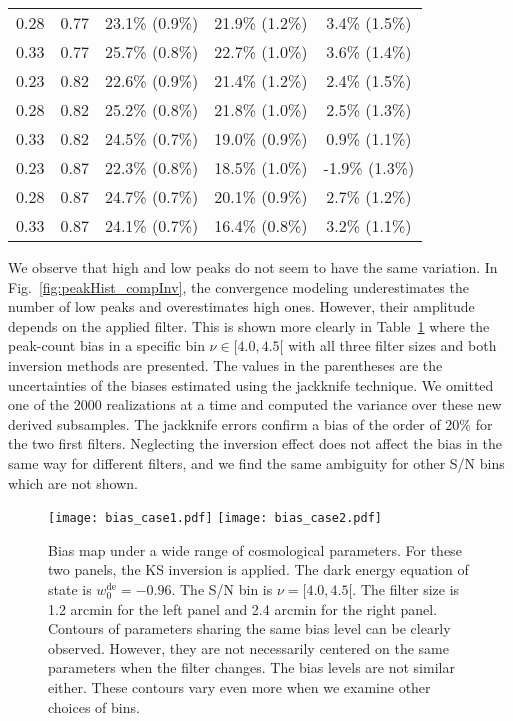 \documentclass{aa} %
\newcommand{\fig}[1]{Fig.~\ref{#1}}
\newcommand{\tab}[1]{Table~\ref{#1}}
\newcommand{\wZero}{w_0^\mathrm{de}}
\begin{document}
\begin{table}[tb]
\begin{tabular}{cc|ccc}
        0.28 & 0.77 &  23.1\%  (0.9\%) &  21.9\%  (1.2\%) &   3.4\%  (1.5\%) \\
        0.33 & 0.77 &  25.7\%  (0.8\%) &  22.7\%  (1.0\%) &   3.6\%  (1.4\%) \\
        0.23 & 0.82 &  22.6\%  (0.9\%) &  21.4\%  (1.2\%) &   2.4\%  (1.5\%) \\
        0.28 & 0.82 &  25.2\%  (0.8\%) &  21.8\%  (1.0\%) &   2.5\%  (1.3\%) \\
        0.33 & 0.82 &  24.5\%  (0.7\%) &  19.0\%  (0.9\%) &   0.9\%  (1.1\%) \\
        0.23 & 0.87 &  22.3\%  (0.8\%) &  18.5\%  (1.0\%) &  -1.9\%  (1.3\%) \\
        0.28 & 0.87 &  24.7\%  (0.7\%) &  20.1\%  (0.9\%) &   2.7\%  (1.2\%) \\
        0.33 & 0.87 &  24.1\%  (0.7\%) &  16.4\%  (0.8\%) &   3.2\%  (1.1\%) \\
        \hline
    \end{tabular}
        \label{tab:bias_filter}
\end{table}

We observe that high and low peaks do not seem to have the same variation. In \fig{fig:peakHist_compInv}, the convergence modeling underestimates the number of low peaks and overestimates high ones. However, their amplitude depends on the applied filter. This is shown more clearly in \tab{tab:bias_filter} where the peak-count bias in a specific bin $\nu\in[4.0, 4.5[$ with all three filter sizes and both inversion methods are presented. The values in the parentheses are the uncertainties of the biases estimated using the jackknife technique. We omitted one of the 2000 realizations at a time and computed the variance over these new derived subsamples. The jackknife errors confirm a bias of the order of 20\% for the two first filters. Neglecting the inversion effect does not affect the bias in the same way for different filters, and we find the same ambiguity for other S/N bins which are not shown.

\begin{figure*}[tb]
        \centering
        \texttt{[image: bias\_case1.pdf]}
        \texttt{[image: bias\_case2.pdf]}
        \caption{Bias map under a wide range of cosmological parameters. For these two panels, the KS inversion is applied. The dark energy equation of state is $\wZero=-0.96$. The S/N bin is $\nu=[4.0, 4.5[$. The filter size is 1.2 arcmin for the left panel and 2.4 arcmin for the right panel. Contours of parameters sharing the same bias level can be clearly observed. However, they are not necessarily centered on the same parameters when the filter changes. The bias levels are not similar either. These contours vary even more when we examine other choices of bins.}
        \label{fig:bias_case2}
\end{figure*}
\end{document}

